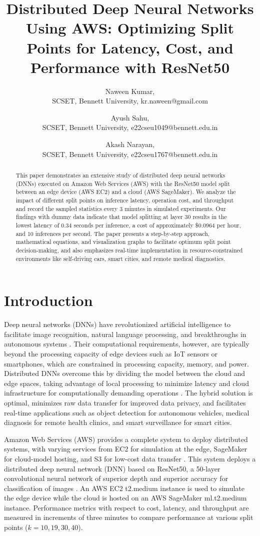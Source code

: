 \documentclass[conference]{IEEEtran}
\title{Distributed Deep Neural Networks Using AWS: Optimizing Split Points for Latency, Cost, and Performance with ResNet50}
\author{
  Naween Kumar, \\
  SCSET, Bennett University, kr.naween@gmail.com
  \and
  Ayush Sahu, \\
  SCSET, Bennett University, e22cseu1049@bennett.edu.in \\
  \and
  Akash Narayan, \\
  SCSET, Bennett University, e22cseu1767@bennett.edu.in
}
\begin{document}
\maketitle

\begin{abstract}
This paper demonstrates an extensive study of distributed deep neural networks (DNNs) executed on Amazon Web Services (AWS) with the ResNet50 model split between an edge device (AWS EC2) and a cloud (AWS SageMaker). We analyze the impact of different split points on inference latency, operation cost, and throughput and record the sampled statistics every 3 minutes in simulated experiments. Our findings with dummy data indicate that model splitting at layer 30 results in the lowest latency of 0.34 seconds per inference, a cost of approximately \$0.0964 per hour, and 10 inferences per second. The paper presents a step-by-step approach, mathematical equations, and visualization graphs to facilitate optimum split point decision-making, and also emphasizes real-time implementation in resource-constrained environments like self-driving cars, smart cities, and remote medical diagnostics.
\end{abstract}

\section{Introduction}
Deep neural networks (DNNs) have revolutionized artificial intelligence to facilitate image recognition, natural language processing, and breakthroughs in autonomous systems \cite{he2016deep}. Their computational requirements, however, are typically beyond the processing capacity of edge devices such as IoT sensors or smartphones, which are constrained in processing capacity, memory, and power. Distributed DNNs overcome this by dividing the model between the cloud and edge spaces, taking advantage of local processing to minimize latency and cloud infrastructure for computationally demanding operations \cite{teerapittayanon2017distributed}. The hybrid solution is optimal, minimizes raw data transfer for improved data privacy, and facilitates real-time applications such as object detection for autonomous vehicles, medical diagnosis for remote health clinics, and smart surveillance for smart cities.

Amazon Web Services (AWS) provides a complete system to deploy distributed systems, with varying services from EC2 for simulation at the edge, SageMaker for cloud-model hosting, and S3 for low-cost data transfer \cite{aws_sagemaker}. This system deploys a distributed deep neural network (DNN) based on ResNet50, a 50-layer convolutional neural network of superior depth and superior accuracy for classification of images \cite{he2016deep}. An AWS EC2 t2.medium instance is used to simulate the edge device while the cloud is hosted on an AWS SageMaker ml.t2.medium instance. Performance metrics with respect to cost, latency, and throughput are measured in increments of three minutes to compare performance at various split points (\( k = 10, 19, 30, 40 \)).
\end{document}
